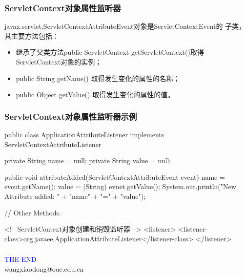 \begin{frame}[fragile] %
\frametitle{ServletContext对象属性监听器}

javax.servlet.ServletContextAttributeEvent对象是ServletContextEvent的
子类，其主要方法包括：

\begin{itemize}
\item 继承了父类方法public ServletContext getServletContext()取得
ServletContext对象的实例；
\item public String getName() 取得发生变化的属性的名称；
\item public Object getValue() 取得发生变化的属性的值。
\end{itemize}
\end{frame}

\begin{frame}[fragile] %
\frametitle{ServletContext对象属性监听器示例}


\begin{javaCode}
public class ApplicationAttributeListener implements
ServletContextAttributeListener {
  private String name = null;
  private String value = null;
  
  public void attributeAdded(ServletContextAttributeEvent event) {
    name = event.getName();
    value = (String) evnet.getValue();
    System.out.println("New Attribute added: " + "name" + "=" + "value");
  }

  // Other Methods.

}
\end{javaCode}
\begin{xmlCode}
<!-- ServletContext对象创建和销毁监听器 -->
<listener>
  <listener-class>org.javaee.ApplicationAttributeListener</listener-class>
</listener> 
\end{xmlCode}
\end{frame}

\begin{frame}[fragile] %
\frametitle{} 

\end{frame}
\begin{frame}
\centering
{\Huge \textcolor{blue}{THE END}} \\
\vspace{5mm}
{\Large wangxiaodong@ouc.edu.cn} \\
\end{frame}

